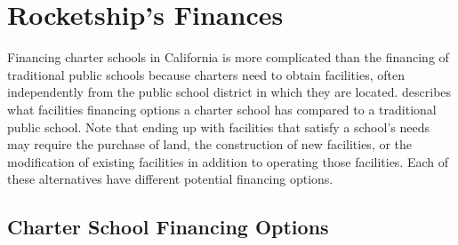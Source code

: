 \section{Rocketship's Finances}\indent
\label{sec:rocketship_finances}

  Financing charter schools in California is more complicated than the financing of traditional public schools because charters need to obtain facilities, often independently from the public school district in which they are located.
 describes what facilities financing options a charter school has compared to a traditional public school. Note that ending up with facilities that satisfy a school's needs may require the purchase of land, the construction of new facilities, or the modification of existing facilities in addition to operating those facilities. Each of these alternatives have different potential financing options.

\subsection{Charter School Financing Options}\indent\label{sec:charter-school-financing-options}

